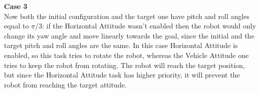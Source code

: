 \documentclass{article}
\begin{document}
{\large \textbf{Case 3}} \\
Now both the initial configuration and the target one have pitch and roll angles equal to $ \pi/3 $: if the Horizontal Attitude wasn't enabled then the robot would only change its yaw angle and move linearly towards the goal, since the initial and the target pitch and roll angles are the same. In this case Horizontal Attitude is enabled, so this task tries to rotate the robot, whereas the Vehicle Attitude one tries to keep the robot from rotating. The robot will reach the target position, but since the Horizontal Attitude task has higher priority, it will prevent the robot from reaching the target attitude.
\begin{figure}[H]
	\centering
	\hspace{10mm}
	\label{fig:q2case3ab}
\end{figure}
\end{document}
